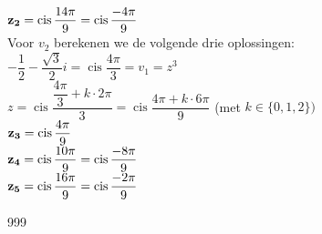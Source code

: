 \documentclass[a4paper]{article}
\newcommand{\cis}{\operatorname{cis}}
\begin{document}
${\bf z_2} = \cis \dfrac{14\pi}{9} = \cis \dfrac{-4\pi}{9}$ \\

Voor $v_2$ berekenen we de volgende drie oplossingen: \\

$-\dfrac{1}{2} - \dfrac{\sqrt{3}}{2}i = \cis \dfrac{4\pi}{3} = v_1 = z^3$ \\

$z = \cis \dfrac{\dfrac{4\pi}{3} + k\cdot2\pi}{3} = \cis \dfrac{4\pi + k\cdot6\pi}{9}$ (met $k \in \{0,1,2\})$ \\

${\bf z_3} = \cis \dfrac{4\pi}{9}$ \\

${\bf z_4} = \cis \dfrac{10\pi}{9} = \cis \dfrac{-8\pi}{9}$ \\

${\bf z_5} = \cis \dfrac{16\pi}{9} = \cis \dfrac{-2\pi}{9}$ \\

\begin{thebibliography}{999}
\end{thebibliography}
\end{document}
